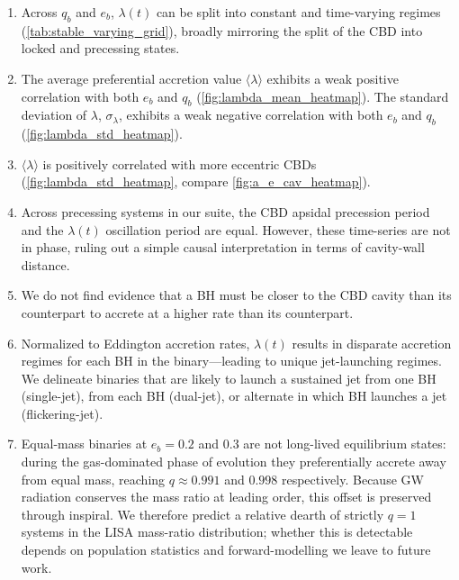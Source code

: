 \documentclass[fleqn,usenatbib]{mnras}
\begin{document}
\begin{enumerate}
    \item Across $q_b$ and $e_b$, $\lambda(t)$ can be split into constant and time-varying regimes (\autoref{tab:stable_varying_grid}), broadly mirroring the split of the CBD into locked and precessing states.
    \item The average preferential accretion value $\langle \lambda \rangle$ exhibits a weak positive correlation with both $e_b$ and $q_b$ (\autoref{fig:lambda_mean_heatmap}). The standard deviation of $\lambda$, $\sigma_{\lambda}$, exhibits a weak negative correlation with both $e_b$ and $q_b$ (\autoref{fig:lambda_std_heatmap}).
    \item $\langle \lambda \rangle$ is positively correlated with more eccentric CBDs (\autoref{fig:lambda_std_heatmap}, compare \autoref{fig:a_e_cav_heatmap}).
    \item Across precessing systems in our suite, the CBD apsidal precession period and the $\lambda(t)$ oscillation period are equal. However, these time-series are not in phase, ruling out a simple causal interpretation in terms of cavity-wall distance.
    \item We do not find evidence that a BH must be closer to the CBD cavity than its counterpart to accrete at a higher rate than its counterpart.
    \item Normalized to Eddington accretion rates, $\lambda(t)$ results in disparate accretion regimes for each BH in the binary---leading to unique jet-launching regimes. We delineate binaries that are likely to launch a sustained jet from one BH (single-jet), from each BH (dual-jet), or alternate in which BH launches a jet (flickering-jet).
    \item Equal-mass binaries at $e_b = 0.2$ and $0.3$ are not long-lived equilibrium states: during the gas-dominated phase of evolution they preferentially accrete away from equal mass, reaching $q \approx 0.991$ and $0.998$ respectively. Because GW radiation conserves the mass ratio at leading order, this offset is preserved through inspiral. We therefore predict a relative dearth of strictly $q = 1$ systems in the LISA mass-ratio distribution; whether this is detectable depends on population statistics and forward-modelling we leave to future work.
\end{enumerate}
\end{document}
